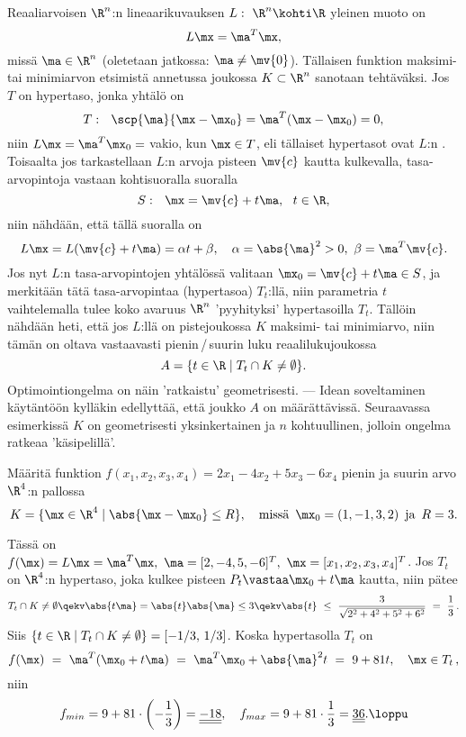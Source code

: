 Reaaliarvoisen $\R^n$:n lineaarikuvauksen $L:\ \R^n \kohti \R$ yleinen muoto on
\[ 
L\mx = \ma^T \mx,
\]
missä $\ma \in \R^n$ (oletetaan jatkossa: $\ma\neq\mv{0}$). Tällaisen funktion maksimi- tai 
minimiarvon etsimistä annetussa joukossa $K \subset \R^n$ sanotaan 
tehtäväksi. Jos $T$ on hypertaso, jonka yhtälö on
\[ 
T:\ \ \scp{\ma}{\mx-\mx_0}=\ma^T(\mx-\mx_0)= 0, 
\]
niin $L\mx = \ma^T \mx_0=$ vakio, kun $\mx \in T$, eli tällaiset hypertasot ovat $L$:n 
%
. Toisaalta jos tarkastellaan $L$:n arvoja pisteen $\mv{c}$ kautta 
kulkevalla, tasa-arvopintoja vastaan kohtisuoralla suoralla
\[ 
S:\ \ \mx = \mv{c} + t \ma,\ \ t \in \R, 
\]
niin nähdään, että tällä suoralla on
\[
L\mx = L(\mv{c}+t\ma) = \alpha t+\beta, \quad \alpha = \abs{\ma}^2 > 0,\ \beta = \ma^T\mv{c}.
\]
Jos nyt $L$:n tasa-arvopintojen yhtälössä valitaan $\mx_0 = \mv{c}+t\ma \in S$, ja merkitään 
tätä tasa-arvopintaa (hypertasoa) $T_t$:llä, niin parametria $t$ vaihtelemalla tulee koko
avaruus $\R^n$ 'pyyhityksi' hypertasoilla $T_t$. Tällöin nähdään heti, että jos $L$:llä on 
pistejoukossa $K$ maksimi- tai minimiarvo, niin tämän on oltava vastaavasti pienin\,/\,suurin 
luku reaalilukujoukossa
\[
A = \{t\in\R \mid T_t \cap K \neq \emptyset\}.
\]
Optimointiongelma on näin 'ratkaistu' geometrisesti. --- Idean soveltaminen käytäntöön kylläkin
edellyttää, että joukko $A$ on määrättävissä. Seuraavassa esimerkissä $K$ on geometrisesti 
yksinkertainen ja $n$ kohtuullinen, jolloin ongelma ratkeaa 'käsipelillä'. 
\begin{Exa} Määritä funktion $f(x_1,x_2,x_3,x_4) = 2x_1-4x_2+5x_3-6x_4$ pienin ja suurin arvo
$\R^4$:n pallossa
\[
K= \{\mx\in\R^4 \mid \abs{\mx-\mx_0} \le R\}, \quad 
               \text{missä}\,\ \mx_0=(1,-1,3,2)\,\ \text{ja}\,\ R=3. 
\]
\end{Exa}
\ratk Tässä on $f(\mx)=L\mx=\ma^T\mx,\ \ma=[2,-4,5,-6]^T,\ \mx=[x_1,x_2,x_3,x_4]^T$. Jos $T_t$
on $\R^4$:n hypertaso, joka kulkee pisteen $P_t \vastaa \mx_0+t\ma$ kautta, niin pätee
\[
T_t \cap K \neq \emptyset \qekv \abs{t\ma}=\abs{t}\abs{\ma} 
                                          \le 3 \qekv \abs{t}\ 
                                          \le\ \frac{3}{\sqrt{2^2+4^2+5^2+6^2}}\ 
                                          =\ \frac{1}{3}\,.
\]
Siis $\{t\in\R \mid T_t \cap K \neq \emptyset\} = [-1/3,\,1/3]$. Koska hypertasolla $T_t$ on
\[
f(\mx)\ =\ \ma^T(\mx_0+t\ma)\ =\ \ma^T\mx_0+\abs{\ma}^2 t\ =\ 9+81 t, \quad \mx \in T_t\,,
\]
niin
\[
f_{min}=9+81\cdot\left(-\frac{1}{3}\right)=\underline{\underline{-18}}, \quad 
f_{max}=9+81\cdot\frac{1}{3}=\underline{\underline{36}}. \loppu
\]

